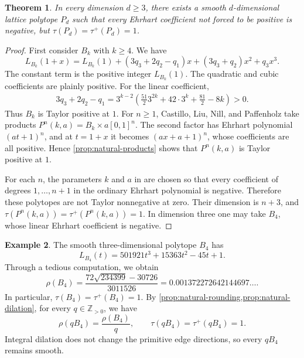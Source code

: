 \documentclass[reqno, 12pt]{article}
\numberwithin{equation}{section}
\newtheorem{theorem}{Theorem}[section]
\theoremstyle{definition}
\newtheorem{example}[theorem]{Example}
\newcommand{\Z}{\mathbb{Z}}
\begin{document}
\begin{theorem}\label{thm:natural-smooth-center-one}
In every dimension $d\geq3$, there exists a smooth $d$-dimensional lattice polytope $P_d$ such that every Ehrhart coefficient not forced to be positive is negative, but $\tau(P_d)=\tau^+(P_d)=1$.
\end{theorem}
\begin{proof}
First consider $B_k$ with $k\geq4$. We have 
\[
 L_{B_k}(1+x)
 =L_{B_k}(1)+(3q_3+2q_2-q_1)x
 +(3q_3+q_2)x^2+q_3x^3.
\]
The constant term is the positive integer $L_{B_k}(1)$.  The quadratic
and cubic coefficients are plainly positive.  For the linear coefficient,
\begin{align*}
3q_3+2q_2-q_1=3^{k-2}\left(\frac{51}{2}3^{2k}+42\cdot3^k+\frac{81}{2}-8k\right)>0.
\end{align*}
Thus $B_k$ is Taylor positive at $1$.
For $n\geq1$, Castillo, Liu, Nill, and Paffenholz take products $P^{n}(k,a)=B_k\times a[0,1]^n$.
The second factor has Ehrhart polynomial $(at+1)^n$, and at $t=1+x$ it becomes $(ax+a+1)^n$, whose coefficients are all positive.
Hence \cref{prop:natural-products} shows that $P^{n}(k,a)$ is Taylor positive at $1$.

For each $n$, the parameters $k$ and $a$ in \cite[Theorem~1.2]{CastilloEtAl2018} are chosen so that every coefficient
of degrees $1,\ldots,n+1$ in the ordinary Ehrhart polynomial is negative. Therefore these polytopes are not Taylor nonnegative at zero.  Their dimension is $n+3$, and $\tau(P^n(k,a))=\tau^+(P^n(k,a))=1$.  In dimension three one may take $B_4$, whose linear Ehrhart coefficient is negative.
\end{proof}



\begin{example}\label{thm:natural-smooth-real-center}
The smooth three-dimensional polytope $B_4$ has
\[L_{B_4}(t)=501921t^3+15363t^2-45t+1.
\]
Through a tedious computation, we obtain
\begin{equation*}
 \rho(B_4)=\frac{72\sqrt{234399}-30726}{3011526}=0.001372272642144697\ldots.
\end{equation*}
In particular, $\tau(B_4)=\tau^+(B_4)=1$.
By \cref{prop:natural-rounding,prop:natural-dilation}, for every $q\in\Z_{>0}$, we have 
\[\rho(qB_4)=\frac{\rho(B_4)}q,\qquad\tau(qB_4)=\tau^+(qB_4)=1.
\]
Integral dilation does not change the primitive edge directions, so every $qB_4$ remains smooth.
\end{example}
\end{document}
